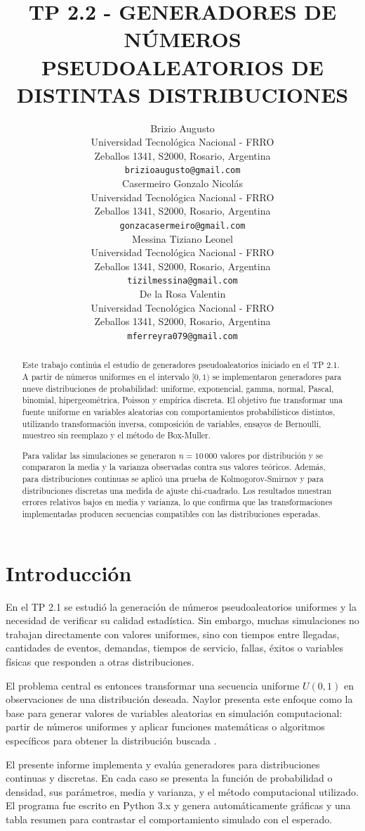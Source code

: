 \documentclass{article}
\title{TP 2.2 - GENERADORES DE NÚMEROS PSEUDOALEATORIOS DE DISTINTAS DISTRIBUCIONES}
\author{
  Brizio Augusto \\
  Universidad Tecnológica Nacional - FRRO \\
  Zeballos 1341, S2000, Rosario, Argentina \\
  \texttt{brizioaugusto@gmail.com} \\
  \And
  Casermeiro Gonzalo Nicolás \\
  Universidad Tecnológica Nacional - FRRO \\
  Zeballos 1341, S2000, Rosario, Argentina \\
  \texttt{gonzacasermeiro@gmail.com} \\
  \And
  Messina Tiziano Leonel \\
  Universidad Tecnológica Nacional - FRRO \\
  Zeballos 1341, S2000, Rosario, Argentina \\
  \texttt{tizilmessina@gmail.com} \\
  \And
  De la Rosa Valentin \\
  Universidad Tecnológica Nacional - FRRO \\
  Zeballos 1341, S2000, Rosario, Argentina \\
  \texttt{mferreyra079@gmail.com} \\
}
\begin{document}
\maketitle

\begin{abstract}
Este trabajo continúa el estudio de generadores pseudoaleatorios iniciado en el
TP 2.1. A partir de números uniformes en el intervalo $[0,1)$ se implementaron
generadores para nueve distribuciones de probabilidad: uniforme, exponencial,
gamma, normal, Pascal, binomial, hipergeométrica, Poisson y empírica discreta.
El objetivo fue transformar una fuente uniforme en variables aleatorias con
comportamientos probabilísticos distintos, utilizando transformación inversa,
composición de variables, ensayos de Bernoulli, muestreo sin reemplazo y el
método de Box-Muller.

Para validar las simulaciones se generaron $n=10\,000$ valores por distribución
y se compararon la media y la varianza observadas contra sus valores teóricos.
Además, para distribuciones continuas se aplicó una prueba de
Kolmogorov-Smirnov y para distribuciones discretas una medida de ajuste
chi-cuadrado. Los resultados muestran errores relativos bajos en media y
varianza, lo que confirma que las transformaciones implementadas producen
secuencias compatibles con las distribuciones esperadas.
\end{abstract}

\section{Introducción}

En el TP 2.1 se estudió la generación de números pseudoaleatorios uniformes y
la necesidad de verificar su calidad estadística. Sin embargo, muchas
simulaciones no trabajan directamente con valores uniformes, sino con tiempos
entre llegadas, cantidades de eventos, demandas, tiempos de servicio, fallas,
éxitos o variables físicas que responden a otras distribuciones.

El problema central es entonces transformar una secuencia uniforme $U(0,1)$ en
observaciones de una distribución deseada. Naylor presenta este enfoque como la
base para generar valores de variables aleatorias en simulación computacional:
partir de números uniformes y aplicar funciones matemáticas o algoritmos
específicos para obtener la distribución buscada \cite{naylor}.

El presente informe implementa y evalúa generadores para distribuciones
continuas y discretas. En cada caso se presenta la función de probabilidad o
densidad, sus parámetros, media y varianza, y el método computacional utilizado.
El programa fue escrito en Python 3.x y genera automáticamente gráficas y una
tabla resumen para contrastar el comportamiento simulado con el esperado.
\end{document}

